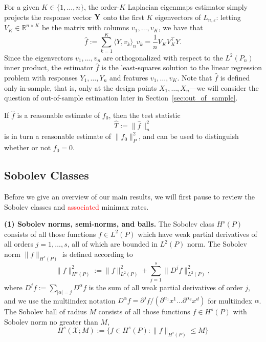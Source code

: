 \documentclass{article}
\newcommand{\Reals}{\mathbb{R}}
\newcommand{\1}{\mathbf{1}}
\newcommand{\Leb}{L}
\newcommand{\mc}[1]{\mathcal{#1}}
\newcommand{\dotp}[2]{\langle #1, #2 \rangle}
\newcommand{\wh}[1]{\widehat{#1}}
\theoremstyle{alden}
\theoremstyle{aldenthm}
\theoremstyle{definition}
\theoremstyle{remark}
\begin{document}
For a given $K \in \{1,\ldots,n\}$, the order-$K$ Laplacian eigenmaps estimator simply projects the response vector ${\bf Y}$ onto the first $K$ eigenvectors of $L_{n,\varepsilon}$: letting $V_K \in \Reals^{n \times K}$ be the matrix with columns $v_1,\ldots,v_K$, we have that
\begin{equation}
\label{eqn:laplacian_eigenmaps_estimator}
\wh{f} := \sum_{k = 1}^{K} \dotp{Y}{v_k}_{n} v_k = \frac{1}{n} V_K V_K^{\top} Y.
\end{equation} 
Since the eigenvectors $v_1,\ldots,v_n$ are orthogonalized with respect to the $L^2(P_n)$ inner product, the estimator $\wh{f}$ is the least-squares solution to the linear regression problem with responses $Y_1,\ldots,Y_n$ and features $v_1,\ldots,v_K$. Note that $\wh{f}$ is defined only in-sample, that is, only at the design points $X_1,\ldots,X_n$---we will consider the question of out-of-sample estimation later in Section~\ref{sec:out_of_sample}. 

If $\wh{f}$ is a reasonable estimate of $f_0$, then the test statistic
\begin{equation}
\label{eqn:laplacian_eigenmaps_test}
\wh{T} := \|\wh{f}\|_n^2
\end{equation}
is in turn a reasonable estimate of $\|f_0\|_{P}^2$, and can be used to distinguish whether or not $f_0 = 0$.

\subsection{Sobolev Classes}
\label{sec:sobolev}
Before we give an overview of our main results, we will first pause to review the Sobolev classes and \textcolor{red}{associated} minimax rates.

\textbf{(1) Sobolev norms, semi-norms, and balls.} 
The Sobolev class $H^s(P)$ consists of all those functions $f \in \Leb^2(P)$ which have weak partial derivatives of all orders $j = 1,\ldots,s$, all of which are bounded in $\Leb^2(P)$ norm. The Sobolev norm $\|f\|_{H^s(P)}$ is defined according to
\begin{equation*}
\|f\|_{H^s(P)}^2 := \|f\|_{\Leb^2(P)}^2 + \sum_{j = 1}^{s} \|D^jf\|_{\Leb^2(P)}^2,
\end{equation*}
where $D^jf := \sum_{|\alpha| = j}D^{\alpha}f$ is the sum of all weak partial derivatives of order $j$, and we use the multiindex notation $D^{\alpha}f = \partial^j f/(\partial^{\alpha_1}x^1\ldots \partial^{\alpha_d}x^d)$ for multiindex $\alpha$. The Sobolev ball of radius $M$ consists of all those functions $f \in H^s(P)$ with Sobolev norm no greater than $M$,
\begin{equation*}
H^s(\mc{X};M) := \{f \in H^s(P): \|f\|_{H^s(P)} \leq M\}
\end{equation*}
\end{document}
